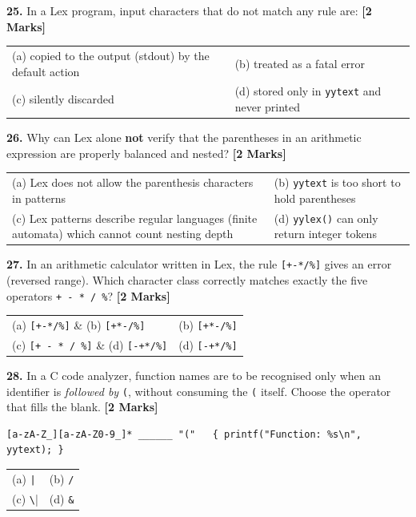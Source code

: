 \documentclass[11pt,a4paper]{article}
\begin{document}
\noindent \textbf{25.} In a Lex program, input characters that do not match any rule are: \hfill \textbf{[2 Marks]}
\vspace{0.06cm}
\noindent
\begin{tabularx}{\textwidth}{@{}X X@{}}
(a) copied to the output (stdout) by the default action & (b) treated as a fatal error \\[3pt]
(c) silently discarded & (d) stored only in \texttt{yytext} and never printed \\
\end{tabularx}

\vspace{0.22cm}

\noindent \textbf{26.} Why can Lex alone \textbf{not} verify that the parentheses in an arithmetic expression are properly balanced and nested? \hfill \textbf{[2 Marks]}
\vspace{0.06cm}
\noindent
\begin{tabularx}{\textwidth}{@{}X X@{}}
(a) Lex does not allow the parenthesis characters in patterns & (b) \texttt{yytext} is too short to hold parentheses \\[3pt]
(c) Lex patterns describe regular languages (finite automata) which cannot count nesting depth & (d) \texttt{yylex()} can only return integer tokens \\
\end{tabularx}

\vspace{0.22cm}

\noindent \textbf{27.} In an arithmetic calculator written in Lex, the rule \verb|[+-*/%]| gives an error (reversed range). Which character class correctly matches exactly the five operators \texttt{+ - * / \%}? \hfill \textbf{[2 Marks]}
\vspace{0.06cm}
\noindent
\begin{tabularx}{\textwidth}{@{}X X@{}}
(a) \verb|[+-*/%]| & (b) \verb|[+*-/%]| \\[3pt]
(c) \verb|[+ - * / %]| & (d) \verb|[-+*/%]| \\
\end{tabularx}

\vspace{0.22cm}

\noindent \textbf{28.} In a C code analyzer, function names are to be recognised only when an identifier is \emph{followed by} \texttt{(}, without consuming the \texttt{(} itself. Choose the operator that fills the blank. \hfill \textbf{[2 Marks]}
\begin{lstlisting}
[a-zA-Z_][a-zA-Z0-9_]* ______ "("   { printf("Function: %s\n", yytext); }
\end{lstlisting}
\vspace{0.06cm}
\noindent
\begin{tabularx}{\textwidth}{@{}X X@{}}
(a) \verb/|/ & (b) \texttt{/} \\[3pt]
(c) \verb|\| & (d) \texttt{\&} \\
\end{tabularx}
\end{document}
